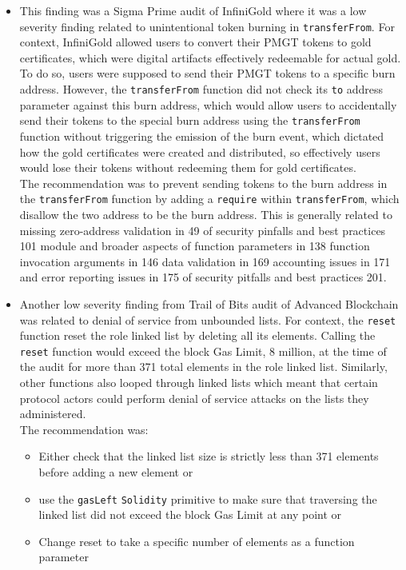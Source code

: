 \begin{itemize}
\item
  This finding was a Sigma Prime audit of InfiniGold where it was a low
  severity finding related to unintentional token burning in
  \texttt{transferFrom}. For context, InfiniGold allowed users to
  convert their PMGT tokens to gold certificates, which were digital
  artifacts effectively redeemable for actual gold. To do so, users were
  supposed to send their PMGT tokens to a specific burn address.
  However, the \texttt{transferFrom} function did not check its
  \texttt{to} address parameter against this burn address, which would
  allow users to accidentally send their tokens to the special burn
  address using the \texttt{transferFrom} function without triggering
  the emission of the burn event, which dictated how the gold
  certificates were created and distributed, so effectively users would
  lose their tokens without redeeming them for gold certificates.\\

  The recommendation was to prevent sending tokens to the burn address
  in the \texttt{transferFrom} function by adding a \texttt{require}
  within \texttt{transferFrom}, which disallow the two address to be the
  burn address. This is generally related to missing zero-address
  validation in 49 of security pinfalls and best practices 101 module
  and broader aspects of function parameters in 138 function invocation
  arguments in 146 data validation in 169 accounting issues in 171 and
  error reporting issues in 175 of security pitfalls and best practices
  201.
\item
  Another low severity finding from Trail of Bits audit of Advanced
  Blockchain was related to denial of service from unbounded lists. For
  context, the \texttt{reset} function reset the role linked list by
  deleting all its elements. Calling the \texttt{reset} function would
  exceed the block Gas Limit, 8 million, at the time of the audit for
  more than 371 total elements in the role linked list. Similarly, other
  functions also looped through linked lists which meant that certain
  protocol actors could perform denial of service attacks on the lists
  they administered.\\

  The recommendation was:

  \begin{itemize}
  \tightlist
  \item
    Either check that the linked list size is strictly less than 371
    elements before adding a new element or
  \item
    use the \texttt{gasLeft} \texttt{Solidity} primitive to make sure
    that traversing the linked list did not exceed the block Gas Limit
    at any point or
  \item
    Change reset to take a specific number of elements as a function
    parameter
  \end{itemize}


\end{itemize}
